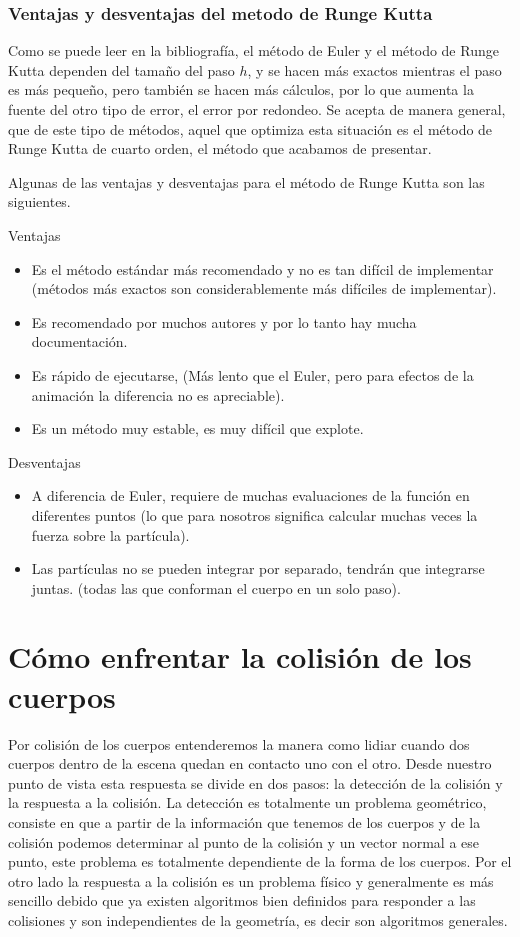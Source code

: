 \subsubsection{Ventajas y desventajas del metodo de Runge Kutta}
Como se puede leer en la bibliografía, el método de Euler y el método de Runge Kutta dependen del tamaño del paso $h$, y se hacen más exactos mientras el paso es más pequeño, pero también se hacen más cálculos, por lo que aumenta la fuente del otro tipo de error, el error por redondeo. Se acepta de manera general, que de este tipo de métodos, aquel que optimiza esta situación es el método de Runge Kutta de cuarto orden, el método que acabamos de presentar.

Algunas de las ventajas y desventajas para el método de Runge Kutta son las siguientes.

Ventajas
\begin{itemize}
\item Es el método estándar más recomendado y no es tan difícil de implementar (métodos más exactos son considerablemente más difíciles de implementar).
\item Es recomendado por muchos autores y por lo tanto hay mucha documentación.
\item Es rápido de ejecutarse, (Más lento que el Euler, pero para efectos de la animación la diferencia no es apreciable).
\item Es un método muy estable, es muy difícil que explote.
\end{itemize}

Desventajas
\begin{itemize}
\item A diferencia de Euler, requiere de muchas evaluaciones de la función en diferentes puntos (lo que para nosotros significa calcular muchas veces la fuerza sobre la partícula).
\item Las partículas no se pueden integrar por separado, tendrán que integrarse juntas. (todas las que conforman el cuerpo en un solo paso).
\end{itemize}

\section{Cómo enfrentar la colisión de los cuerpos}
Por colisión de los cuerpos entenderemos la manera como lidiar cuando dos cuerpos dentro de la escena quedan en contacto uno con el otro. Desde nuestro punto de vista esta respuesta se divide en dos pasos: la detección de la colisión y la respuesta a la colisión.
La detección es totalmente un problema geométrico, consiste en que a partir de la información que tenemos de los cuerpos y de la colisión podemos determinar al punto de la colisión y un vector normal a ese punto, este problema es totalmente dependiente de la forma de los cuerpos. Por el otro lado la respuesta a la colisión es un problema físico y generalmente es más sencillo debido que ya existen algoritmos bien definidos para responder a las colisiones y son independientes de la geometría, es decir son algoritmos generales.

